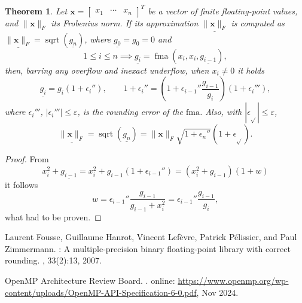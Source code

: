 \documentclass[a4paper,12pt,twoside]{article}
\newtheorem{thm}{Theorem}
\begin{document}
\begin{thm}\label{t:3}
  Let $\mathbf{x}=\begin{bmatrix}x_1&\cdots&x_n\end{bmatrix}^T$ be a
  vector of finite floating-point values, and $\|\mathbf{x}\|_F$ its
  Frobenius norm.  If its approximation $\underline{\|\mathbf{x}\|_F}$
  is computed as
  $\underline{\|\mathbf{x}\|_F}=\mathop\mathrm{sqrt}(\underline{g_n})$,
  where $\underline{g_0}=g_0=0$ and
  \begin{displaymath}
    1\le i\le n\implies\underline{g_i}=\mathop{\mathrm{fma}}(x_i,x_i,\underline{g_{i-1}}),
  \end{displaymath}
  then, barring any overflow and inexact underflow, when $x_i\ne 0$ it
  holds
  \begin{equation}
    \underline{g_i^{}}=g_i^{}(1+\epsilon_i''),\qquad
    1+\epsilon_i''=\left(1+\epsilon_{i-1}''\frac{g_{i-1}^{}}{g_i^{}}\right)(1+\epsilon_i'''),
    \label{e:11}
  \end{equation}
  where $\epsilon_i'''$, $|\epsilon_i'''|\le\varepsilon$, is the
  rounding error of the $\mathrm{fma}$.  Also, with
  $|\epsilon_{\sqrt{}}|\le\varepsilon$,
  \begin{displaymath}
    \underline{\|\mathbf{x}\|_F^{}}=\mathop{\mathrm{sqrt}}(\underline{g_n^{}})=\|\mathbf{x}\|_F^{}\sqrt{1+\epsilon_n''}(1+\epsilon_{\sqrt{}}^{}).
  \end{displaymath}
\end{thm}
\begin{proof}
  From
  \begin{displaymath}
    x_i^2+\underline{g_{i-1}^{}}=x_i^2+g_{i-1}^{}(1+\epsilon_{i-1}'')=(x_i^2+g_{i-1}^{})(1+w)
  \end{displaymath}
  it follows
  \begin{displaymath}
    w=\epsilon_{i-1}''\frac{g_{i-1}^{}}{g_{i-1}^{}+x_i^2}=\epsilon_{i-1}''\frac{g_{i-1}^{}}{g_i^{}},
  \end{displaymath}
  what had to be proven.
\end{proof}
%
%
\begin{thebibliography}{1}

Laurent Fousse, Guillaume Hanrot, Vincent Lef\`{e}vre, Patrick P\'{e}lissier,
  and Paul Zimmermann.
: A multiple-precision binary floating-point library with
  correct rounding.
, 33(2):13, 2007.

{OpenMP Architecture Review Board}.
.
\newblock online:
  \url{https://www.openmp.org/wp-content/uploads/OpenMP-API-Specification-6-0.pdf},
  Nov 2024.

\end{thebibliography}
%
\end{document}
